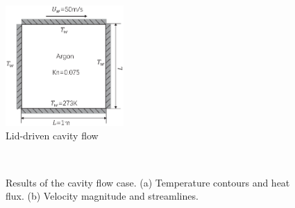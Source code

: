 \begin{figure}
  \centering
  \includegraphics[width=0.4\textwidth]{img/ldc.eps}
  \caption{Lid-driven cavity flow}\label{ldc}
\end{figure}

\begin{figure}[htbp]
\centering
{} ~
\caption{
Results of the cavity flow case. (a) Temperature contours and heat flux. (b) Velocity magnitude and streamlines.
}\label{ldc_UT}
\end{figure}

